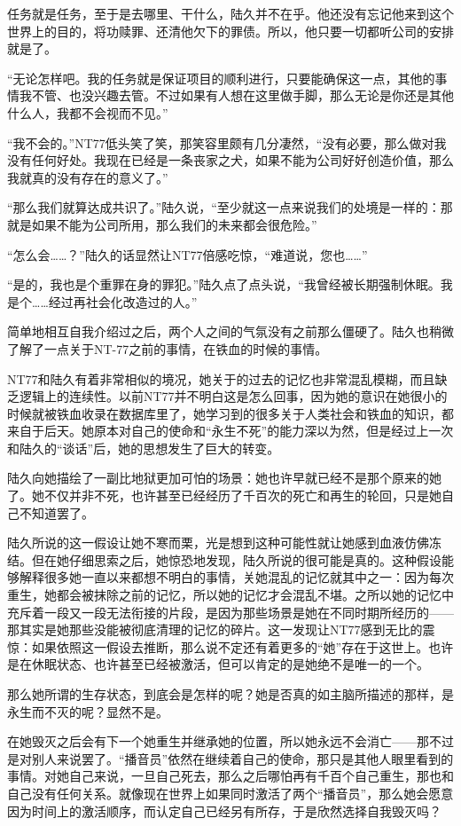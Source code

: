 任务就是任务，至于是去哪里、干什么，陆久并不在乎。他还没有忘记他来到这个世界上的目的，将功赎罪、还清他欠下的罪债。所以，他只要一切都听公司的安排就是了。

“无论怎样吧。我的任务就是保证项目的顺利进行，只要能确保这一点，其他的事情我不管、也没兴趣去管。不过如果有人想在这里做手脚，那么无论是你还是其他什么人，我都不会视而不见。”

“我不会的。”NT77低头笑了笑，那笑容里颇有几分凄然，“没有必要，那么做对我没有任何好处。我现在已经是一条丧家之犬，如果不能为公司好好创造价值，那么我就真的没有存在的意义了。”

“那么我们就算达成共识了。”陆久说，“至少就这一点来说我们的处境是一样的：那就是如果不能为公司所用，那么我们的未来都会很危险。”

“怎么会……？”陆久的话显然让NT77倍感吃惊，“难道说，您也……”

“是的，我也是个重罪在身的罪犯。”陆久点了点头说，“我曾经被长期强制休眠。我是个……经过再社会化改造过的人。”

简单地相互自我介绍过之后，两个人之间的气氛没有之前那么僵硬了。陆久也稍微了解了一点关于NT-77之前的事情，在铁血的时候的事情。

NT77和陆久有着非常相似的境况，她关于的过去的记忆也非常混乱模糊，而且缺乏逻辑上的连续性。以前NT77并不明白这是怎么回事，因为她的意识在她很小的时候就被铁血收录在数据库里了，她学习到的很多关于人类社会和铁血的知识，都来自于后天。她原本对自己的使命和“永生不死”的能力深以为然，但是经过上一次和陆久的“谈话”后，她的思想发生了巨大的转变。

陆久向她描绘了一副比地狱更加可怕的场景：她也许早就已经不是那个原来的她了。她不仅并非不死，也许甚至已经经历了千百次的死亡和再生的轮回，只是她自己不知道罢了。

陆久所说的这一假设让她不寒而栗，光是想到这种可能性就让她感到血液仿佛冻结。但在她仔细思索之后，她惊恐地发现，陆久所说的很可能是真的。这种假设能够解释很多她一直以来都想不明白的事情，关她混乱的记忆就其中之一：因为每次重生，她都会被抹除之前的记忆，所以她的记忆才会混乱不堪。之所以她的记忆中充斥着一段又一段无法衔接的片段，是因为那些场景是她在不同时期所经历的——那其实是她那些没能被彻底清理的记忆的碎片。这一发现让NT77感到无比的震惊：如果依照这一假设去推断，那么说不定还有着更多的“她”存在于这世上。也许是在休眠状态、也许甚至已经被激活，但可以肯定的是她绝不是唯一的一个。

那么她所谓的生存状态，到底会是怎样的呢？她是否真的如主脑所描述的那样，是永生而不灭的呢？显然不是。

在她毁灭之后会有下一个她重生并继承她的位置，所以她永远不会消亡——那不过是对别人来说罢了。“播音员”依然在继续着自己的使命，那只是其他人眼里看到的事情。对她自己来说，一旦自己死去，那么之后哪怕再有千百个自己重生，那也和自己没有任何关系。就像现在世界上如果同时激活了两个“播音员”，那么她会愿意因为时间上的激活顺序，而认定自己已经另有所存，于是欣然选择自我毁灭吗？

